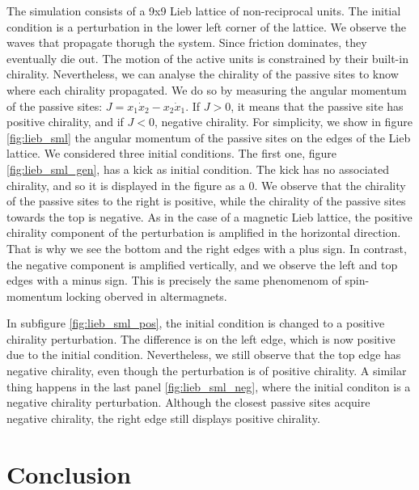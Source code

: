 \documentclass[11pt, a4paper]{article} %
\begin{document}
The simulation consists of a 9x9 Lieb lattice of non-reciprocal units. The initial condition is a perturbation in the 
lower left corner of the lattice. We observe the waves that propagate thorugh the system. Since friction dominates, 
they eventually die out. The motion of the active units is constrained by their built-in chirality. Nevertheless, 
we can analyse the chirality of the passive sites to know where each chirality propagated. We do so 
by measuring the angular momentum of the passive sites: $J = x_1 \dot{x}_2 - x_2 \dot{x}_1$. 
If $J>0$, it means that the passive site has positive chirality, and if $J<0$, negative chirality. 
For simplicity, we show in figure \ref{fig:lieb_sml} the angular momentum of the passive sites on the edges of the Lieb lattice.
We considered three initial conditions. The first one, figure \ref{fig:lieb_sml_gen}, has a kick as initial condition. 
The kick has no associated chirality, and so it is displayed in the figure as a 0. We observe that the chirality 
of the passive sites to the right is positive, while the chirality of the passive sites towards the top is negative.
As in the case of a magnetic Lieb lattice, the positive chirality component of the perturbation is amplified 
in the horizontal direction. That is why we see the bottom and the right edges with a plus sign. In contrast, the 
negative component is amplified vertically, and we observe the left and top edges with a minus sign. 
This is precisely the same phenomenom of spin-momentum locking oberved in altermagnets. 

In subfigure \ref{fig:lieb_sml_pos}, the initial condition is changed to a positive chirality perturbation. 
The difference is on the left edge, which is now positive due to the initial condition. Nevertheless, we still 
observe that the top edge has negative chirality, even though the perturbation is of positive chirality. 
A similar thing happens in the last panel \ref{fig:lieb_sml_neg}, where the initial conditon is a negative chirality perturbation.
Although the closest passive sites acquire negative chirality, the right edge still displays positive chirality. 

\section{Conclusion}
\end{document}
